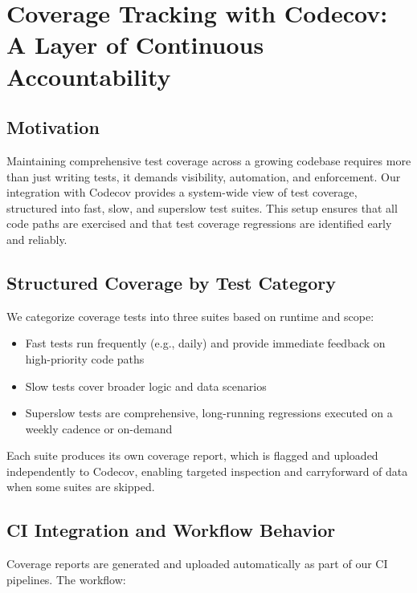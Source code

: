 \documentclass{article}
\begin{document}
\section{Coverage Tracking with Codecov: A Layer of Continuous Accountability}

\subsection{Motivation}

Maintaining comprehensive test coverage across a growing codebase requires more
than just writing tests, it demands visibility, automation, and enforcement. Our
integration with Codecov provides a system-wide view of test coverage, structured
into fast, slow, and superslow test suites. This setup ensures that all code
paths are exercised and that test coverage regressions are identified early and
reliably.

\subsection{Structured Coverage by Test Category}

We categorize coverage tests into three suites based on runtime and scope:

\begin{itemize}

  \item Fast tests run frequently (e.g., daily) and provide immediate feedback on
    high-priority code paths

  \item Slow tests cover broader logic and data scenarios

  \item Superslow tests are comprehensive, long-running regressions executed on
    a weekly cadence or on-demand
\end{itemize}

Each suite produces its own coverage report, which is flagged and uploaded independently
to Codecov, enabling targeted inspection and carryforward of data when some
suites are skipped.

\subsection{CI Integration and Workflow Behavior}

Coverage reports are generated and uploaded automatically as part of our CI pipelines.
The workflow:
\end{document}
